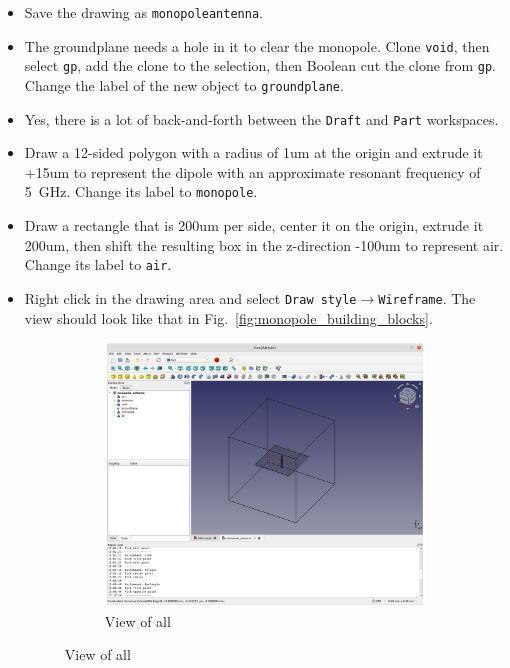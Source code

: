 \documentclass[titlepage]{article}
\renewcommand\_{\textunderscore\linebreak[1]}
\begin{document}
\begin{itemize}
\item Save the drawing as \texttt{monopole\_antenna}.
\item The groundplane needs a hole in it to clear the monopole.  Clone \texttt{void}, then select \texttt{gp}, add the clone to the selection, then Boolean cut the clone from \texttt{gp}.  Change the label of the new object to \texttt{groundplane}.
\item Yes, there is a lot of back-and-forth between the \texttt{Draft} and \texttt{Part} workspaces.
\item Draw a 12-sided polygon with a radius of 1um at the origin and extrude it +15um to represent the dipole with an approximate resonant frequency of 5~GHz. Change its label to \texttt{monopole}.
\item Draw a rectangle that is 200um per side, center it on the origin, extrude it 200um, then shift the resulting box in the z-direction -100um to represent air. Change its label to \texttt{air}.
\item Right click in the drawing area and select \texttt{Draw style}$\rightarrow$\texttt{Wireframe}.  The view should look like that in Fig.~\ref{fig:monopole_building_blocks}.
\begin{figure}
  \centering
  \begin{subfigure}{0.75\textwidth}
     \includegraphics[width=\linewidth]{../tutorials/OpenParEM3D/monopole_antenna/screenshots/monopole_building_blocks}
     \caption{View of all}
  \end{subfigure}
  \par\bigskip

\end{figure}
\end{itemize}
\end{document}
